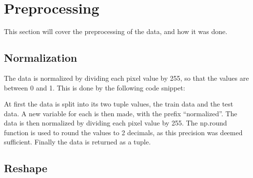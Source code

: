 \section{Preprocessing}\label{sec:method-preprocessing}
This section will cover the preprocessing of the data, and how it was done.

\subsection{Normalization}\label{subsec:method-preprocessing-normalization}
The data is normalized by dividing each pixel value by 255, so that the values are between 0 and 1. This is done by the following code snippet:


At first the data is split into its two tuple values, the train data and the test data. A new variable for each is then made, with the prefix ``normalized''. The data is then normalized by dividing each pixel value by 255. The np.round function is used to round the values to 2 decimals, as this precision was deemed sufficient. Finally the data is returned as a tuple.

\subsection{Reshape}\label{subsec:method-preprocessing-reshape}


